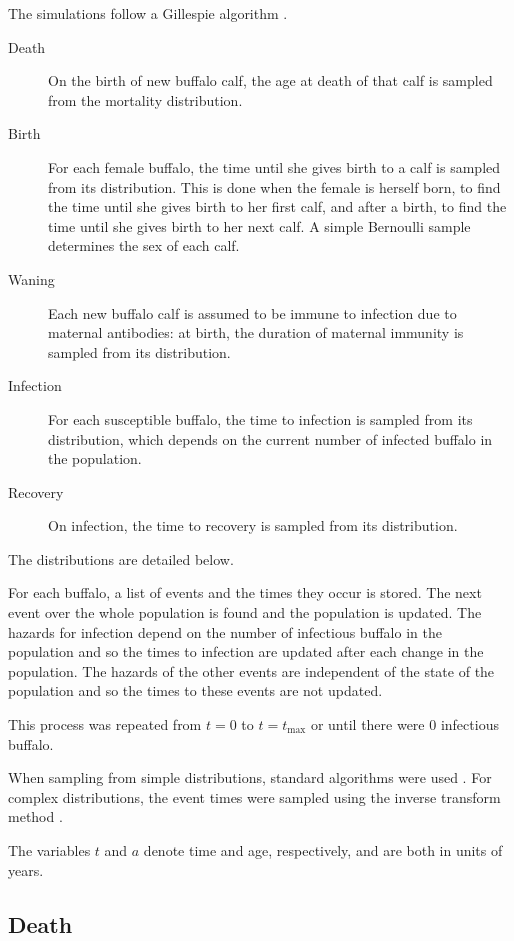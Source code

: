 \documentclass{jpmarticle}
\begin{document}
The simulations follow a Gillespie algorithm \citep{gillespie_1977}.
\begin{description}
\item[Death] On the birth of new buffalo calf, the age at death of
  that calf is sampled from the mortality distribution.

\item[Birth] For each female buffalo, the time until she gives birth
  to a calf is sampled from its distribution.  This is done when the
  female is herself born, to find the time until she gives birth to
  her first calf, and after a birth, to find the time until she gives
  birth to her next calf.  A simple Bernoulli sample determines the
  sex of each calf.

\item[Waning] Each new buffalo calf is assumed to be immune to
  infection due to maternal antibodies: at birth, the duration of
  maternal immunity is sampled from its distribution.

\item[Infection] For each susceptible buffalo, the time to infection
  is sampled from its distribution, which depends on the current
  number of infected buffalo in the population.

\item[Recovery] On infection, the time to recovery is sampled from its
  distribution.
\end{description}
The distributions are detailed below.

For each buffalo, a list of events and the times they occur is stored.
The next event over the whole population is found and the population
is updated.  The hazards for infection depend on the number of
infectious buffalo in the population and so the times to infection are
updated after each change in the population.  The hazards of the other
events are independent of the state of the population and so the times
to these events are not updated.

This process was repeated from $t = 0$ to $t = t_{\text{max}}$ or
until there were $0$ infectious buffalo.

When sampling from simple distributions, standard algorithms were used
\citep{scipy}.  For complex distributions, the event times were
sampled using the inverse transform method \citep{rubinstein_1981}.

The variables $t$ and $a$ denote time and age, respectively, and are
both in units of years.

\subsection{Death}
\end{document}
